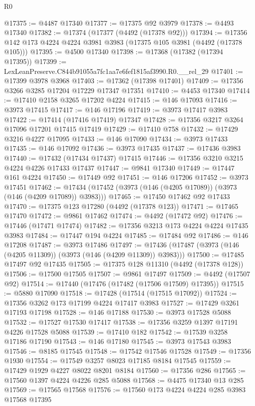 \begin{lexlean}{R0}
\begin{coremodule}
@17375 := @4487 @17340
@17377 := @17375 @92 @3979
@17378 := @4493 @17340
@17382 := @17374 (@17377 (@4492 (@17378 @92)))
@17394 := @17356 @142 @173 @4224 @4224 @3981 @3983 (@17375 @105 @3981 (@4492 (@17378 @105)))
@17395 := @4500 @17340
@17398 := @17368 (@17382 (@17394 @17395))
@17399 := LexLeanPreserve.C844b91055a7fc1aa7e6fef1815af3990.R0.__rel_29
@17401 := @17399 @3978 @3968
@17403 := @17362 (@17398 @17401)
@17409 := @17356 @3266 @3285 @17204 @17229 @17347 @17351
@17410 := @4453 @17340
@17414 := @17410 @2158 @3265 @17202 @4224
@17415 := @146 @17093
@17416 := @3973 @17415
@17417 := @146 @17196
@17419 := @3973 @17417 @3983
@17422 := @17414 (@17416 @17419) @17347
@17428 := @17356 @3217 @3264 @17096 @17201 @17415 @17419
@17429 := @17410 @758
@17432 := @17429 @3216 @4227 @17095
@17433 := @146 @17090
@17434 := @3973 @17433
@17435 := @146 @17092
@17436 := @3973 @17435
@17437 := @17436 @3983
@17440 := @17432 (@17434 @17437) @17415
@17446 := @17356 @3210 @3215 @4224 @4226 @17433 @17437
@17447 := @9841 @17340
@17449 := @17447 @161 @4224
@17450 := @17449 @92
@17451 := @146 @17206
@17452 := @3973 @17451
@17462 := @17434 (@17452 (@3973 (@146 (@4205 @17089)) (@3973 (@146 (@4209 @17089)) @3983)))
@17465 := @17450 @17462 @92 @17433
@17470 := @17375 @123 @17280 (@4492 (@17378 @123))
@17471 := @17465 @17470
@17472 := @9861 @17462
@17474 := @4492 (@17472 @92)
@17476 := @17446 (@17471 @17474)
@17482 := @17356 @3213 @173 @4224 @4224 @17435 @3983
@17484 := @17447 @194 @4224
@17485 := @17484 @92
@17486 := @146 @17208
@17487 := @3973 @17486
@17497 := @17436 (@17487 (@3973 (@146 (@4205 @11309)) (@3973 (@146 (@4209 @11309)) @3983)))
@17500 := @17485 @17497 @92 @17435
@17505 := @17375 @128 @11310 (@4492 (@17378 @128))
@17506 := @17500 @17505
@17507 := @9861 @17497
@17509 := @4492 (@17507 @92)
@17514 := @17440 (@17476 (@17482 (@17506 @17509) @17395))
@17515 := @5880 @17090
@17518 := @17428 (@17514 (@17515 @17092))
@17524 := @17356 @3262 @173 @17199 @4224 @17417 @3983
@17527 := @17429 @3261 @17193 @17198
@17528 := @146 @17188
@17530 := @3973 @17528 @5088
@17532 := @17527 @17530 @17417
@17538 := @17356 @3259 @1397 @17191 @4226 @17528 @5088
@17539 := @17410 @182
@17542 := @17539 @3258 @17186 @17190
@17543 := @146 @17180
@17545 := @3973 @17543 @3983
@17546 := @8185 @17545
@17548 := @17542 @17546 @17528
@17549 := @17356 @1930
@17554 := @17549 @3257 @8023 @17185 @8184 @17545
@17559 := @17429 @1929 @4227 @8022 @8201 @8184
@17560 := @17356 @286
@17565 := @17560 @1397 @4224 @4226 @285 @5088
@17568 := @4475 @17340 @13 @285
@17569 := @17565 @17568
@17576 := @17560 @173 @4224 @4224 @285 @3983 @17568 @17395

\end{coremodule}
\end{lexlean}
